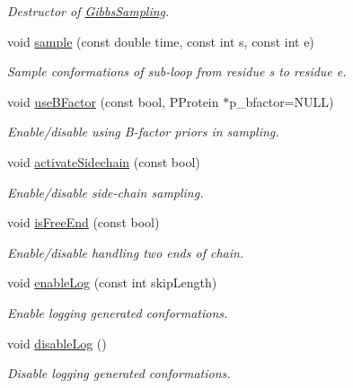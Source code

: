 \begin{DoxyCompactItemize}
\begin{DoxyCompactList}\small\item\em Destructor of \hyperlink{classGibbsSampling}{Gibbs\-Sampling}. \end{DoxyCompactList}\item 
void \hyperlink{classGibbsSampling_a16d1cf9d2c27e85cbeed37e393442ab1}{sample} (const double time, const int s, const int e)
\begin{DoxyCompactList}\small\item\em Sample conformations of sub-\/loop from residue s to residue e. \end{DoxyCompactList}\item 
void \hyperlink{classGibbsSampling_ad470768f4f91a8ed81b31402452505d4}{use\-B\-Factor} (const bool, P\-Protein $\ast$p\-\_\-bfactor=N\-U\-L\-L)
\begin{DoxyCompactList}\small\item\em Enable/disable using B-\/factor priors in sampling. \end{DoxyCompactList}\item 
void \hyperlink{classGibbsSampling_af336b5f1c0fb3d1200db90924756e457}{activate\-Sidechain} (const bool)
\begin{DoxyCompactList}\small\item\em Enable/disable side-\/chain sampling. \end{DoxyCompactList}\item 
void \hyperlink{classGibbsSampling_af71db5285d0caba71b67cc12bbfa93c9}{is\-Free\-End} (const bool)
\begin{DoxyCompactList}\small\item\em Enable/disable handling two ends of chain. \end{DoxyCompactList}\item 
void \hyperlink{classGibbsSampling_a1de603dfe8c7ffface7cbe009229f0f7}{enable\-Log} (const int skip\-Length)
\begin{DoxyCompactList}\small\item\em Enable logging generated conformations. \end{DoxyCompactList}\item 
\hypertarget{classGibbsSampling_a10ce4ab220d6a458fc17074de177d68b}{void \hyperlink{classGibbsSampling_a10ce4ab220d6a458fc17074de177d68b}{disable\-Log} ()}\label{classGibbsSampling_a10ce4ab220d6a458fc17074de177d68b}

\begin{DoxyCompactList}\small\item\em Disable logging generated conformations. \end{DoxyCompactList}\end{DoxyCompactItemize}


